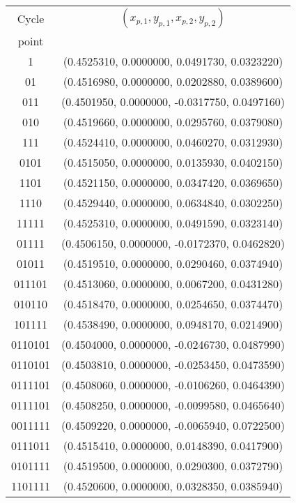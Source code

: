 \begin{table}
	\begin{tabular}{c|c}
	Cycle & $(x_{p,1}, y_{p,1}, x_{p,2}, y_{p,2})$ \\
	point &                                        \\
	\hline
	1  & (0.4525310, 0.0000000, 0.0491730, 0.0323220) \\
 	\hline
	01  & (0.4516980, 0.0000000, 0.0202880, 0.0389600) \\
 	\hline
	011  & (0.4501950, 0.0000000, -0.0317750, 0.0497160) \\
 	\hline
	010  & (0.4519660, 0.0000000, 0.0295760, 0.0379080) \\
 	\hline
	111  & (0.4524410, 0.0000000, 0.0460270, 0.0312930) \\
 	\hline
	0101  & (0.4515050, 0.0000000, 0.0135930, 0.0402150) \\
 	\hline
	1101  & (0.4521150, 0.0000000, 0.0347420, 0.0369650) \\
 	\hline
	1110  & (0.4529440, 0.0000000, 0.0634840, 0.0302250) \\
 	\hline
	11111  & (0.4525310, 0.0000000, 0.0491590, 0.0323140) \\
 	\hline
	01111  & (0.4506150, 0.0000000, -0.0172370, 0.0462820) \\
 	\hline
	01011  & (0.4519510, 0.0000000, 0.0290460, 0.0374940) \\
 	\hline
	011101  & (0.4513060, 0.0000000, 0.0067200, 0.0431280) \\
 	\hline
	010110  & (0.4518470, 0.0000000, 0.0254650, 0.0374470) \\
 	\hline
	101111  & (0.4538490, 0.0000000, 0.0948170, 0.0214900) \\
 	\hline
	0110101  & (0.4504000, 0.0000000, -0.0246730, 0.0487990) \\
 	\hline
	0110101  & (0.4503810, 0.0000000, -0.0253450, 0.0473590) \\
 	\hline
	0111101  & (0.4508060, 0.0000000, -0.0106260, 0.0464390) \\
 	\hline
	0111101  & (0.4508250, 0.0000000, -0.0099580, 0.0465640) \\
 	\hline
	0011111  & (0.4509220, 0.0000000, -0.0065940, 0.0722500) \\
 	\hline
	0111011  & (0.4515410, 0.0000000, 0.0148390, 0.0417900) \\
 	\hline
	0101111  & (0.4519500, 0.0000000, 0.0290300, 0.0372790) \\
 	\hline
	1101111  & (0.4520600, 0.0000000, 0.0328350, 0.0385940) \\

\end{tabular}
\end{table}

